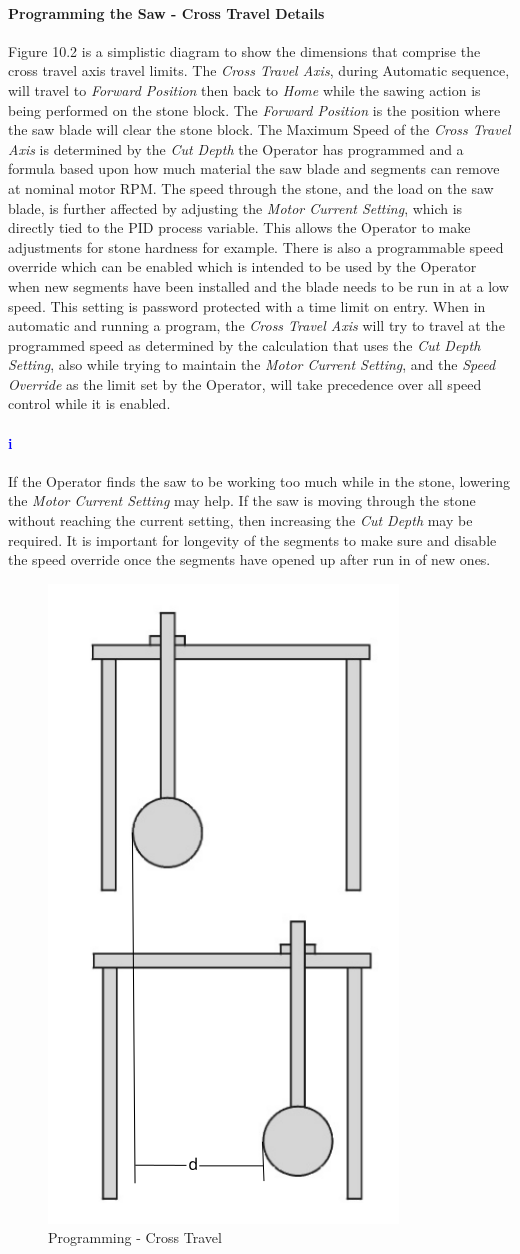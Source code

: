 \paragraph*{Programming the Saw - Cross Travel Details}Figure 10.2 is a simplistic diagram to show the dimensions that comprise the cross travel axis travel limits. The  \textit{Cross Travel Axis}, during Automatic sequence, will travel to \textit{Forward Position} then back to \textit{Home} while the sawing action is being performed on the stone block. The \textit{Forward Position} is the position where the saw blade will clear the stone block. The Maximum Speed of the \textit{Cross Travel Axis} is determined by the \textit{Cut Depth} the Operator has programmed and a formula based upon how much material the saw blade and segments can remove at nominal motor RPM. The speed through the stone, and the load on the saw blade, is further affected by adjusting the \textit{Motor Current Setting}, which is directly tied to the PID process variable. This allows the Operator to make adjustments for stone hardness for example. There is also a programmable speed override which can be enabled which is intended to be used by the Operator when new segments have been installed and the blade needs to be run in at a low speed. This setting is password protected with a time limit on entry. When in automatic and running a program, the \textit{Cross Travel Axis} will try to travel at the programmed speed as determined by the calculation that uses the \textit{Cut Depth Setting}, also while trying to maintain the \textit{Motor Current Setting}, and the \textit{Speed Override} as the limit set by the Operator, will take precedence over all speed control while it is enabled.
\paragraph{\textbf{\LARGE \textcolor{blue}{i}}}If the Operator finds the saw to be working too much while in the stone, lowering the \textit{Motor Current Setting} may help. If the saw is moving through the stone without reaching the current setting, then increasing the \textit{Cut Depth} may be required. It is important for longevity of the segments to make sure and disable the speed override once the segments have opened up after run in of new ones.
\begin{figure}
	\centering
	\includegraphics[width=0.3
	\linewidth]{screen-captures/program/kodiak-saw-crosst-travel}
	\caption{Programming - Cross Travel}
	\label{fig:prg-cross-travel}
\end{figure}
\newpage
